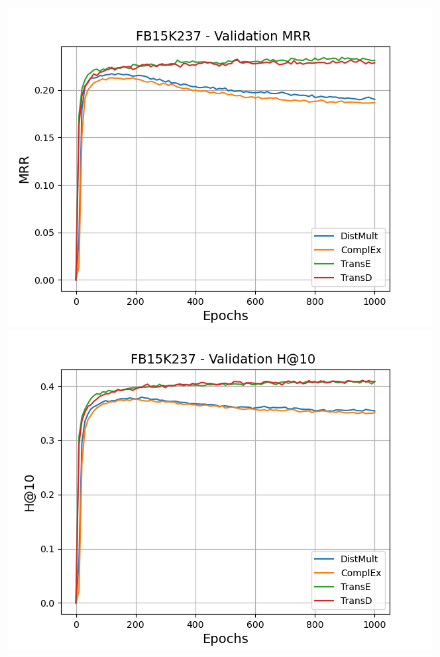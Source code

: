 \begin{figure}
    \centering
    \begin{minipage}{.3\textwidth}
      \centering
      \includegraphics[width=\linewidth]{figures/results/pretrain/fb15k237/pretrain_fb15k237_mrrs.png}
    \end{minipage}%
    \begin{minipage}{.3\textwidth}
      \centering
      \includegraphics[width=\linewidth]{figures/results/pretrain/fb15k237/pretrain_fb15k237_hit10.png}
    \end{minipage}
    \begin{minipage}{.3\textwidth}
      \centering

\end{minipage}
\end{figure}
